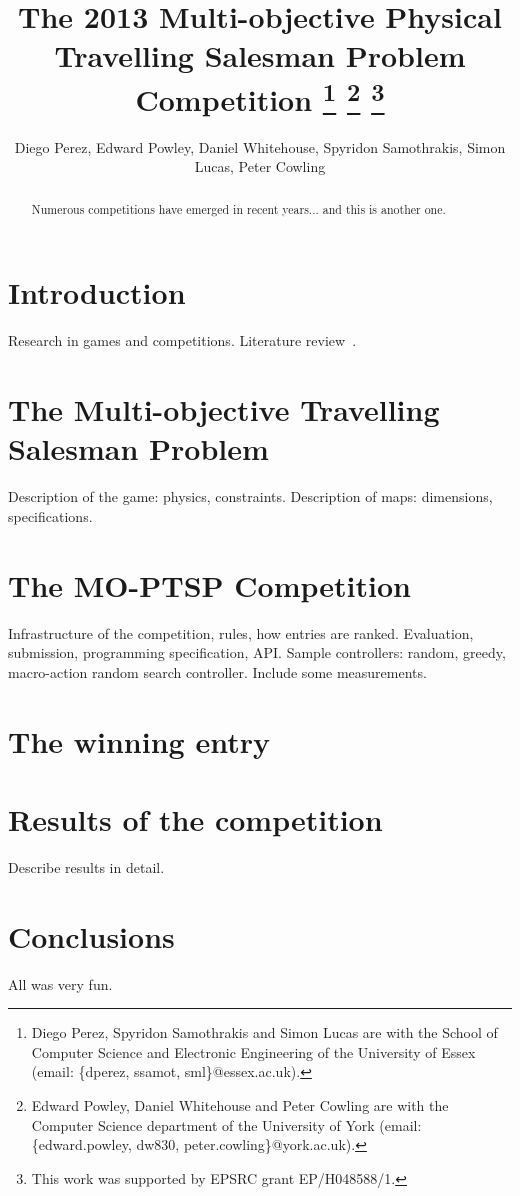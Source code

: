 \documentclass[conference]{IEEEtran}
\begin{document}
\title{The 2013 Multi-objective Physical Travelling Salesman Problem Competition \thanks{Diego Perez, Spyridon Samothrakis and Simon Lucas are with the School of Computer Science and Electronic Engineering of the University of Essex (email: \{dperez, ssamot, sml\}@essex.ac.uk).} \thanks{Edward Powley, Daniel Whitehouse and Peter Cowling are with the Computer Science department of the University of York (email:  \{edward.powley, dw830, peter.cowling\}@york.ac.uk).} \thanks{This work was supported by EPSRC grant EP/H048588/1.}}

\author{Diego Perez, Edward Powley, Daniel Whitehouse, Spyridon Samothrakis, Simon Lucas, Peter Cowling}


\maketitle

\begin{abstract}
Numerous competitions have emerged in recent years... and this is another one.
\end{abstract}


\section{Introduction}

Research in games and competitions.
Literature review~\cite{PerezCEC2012,MCTSSurvey}.

\section{The Multi-objective Travelling Salesman Problem}

Description of the game: physics, constraints.
Description of maps: dimensions, specifications.

\section{The MO-PTSP Competition}

Infrastructure of the competition, rules, how entries are ranked.
Evaluation, submission, programming specification, API.
Sample controllers: random, greedy, macro-action random search controller. Include some measurements.

\section{The winning entry}


\section{Results of the competition}

Describe results in detail.

\section{Conclusions}

All was very fun.



\end{document}
